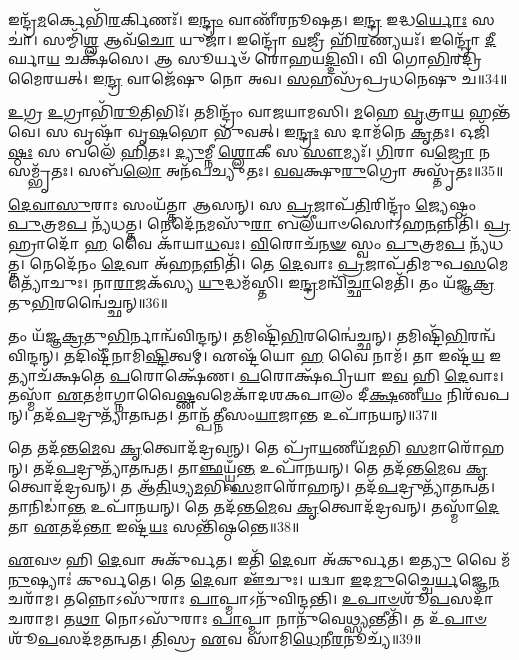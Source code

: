 𑌇𑌨𑍍𑌦𑍍𑌰᳴\-\ul{𑌮}\-𑌰𑍍𑌕𑍇𑌭𑌿᳴\-\ul{𑌰}\-𑌰𑍍𑌕𑌿𑌣𑌃᳴।
𑌇\-\ul{𑌨𑍍𑌦𑍍𑌰𑌂} 𑌵𑌾𑌣𑍀᳴𑌰𑌨𑍂𑌷𑌤।
𑌇\-\ul{𑌨𑍍𑌦𑍍𑌰} 𑌇𑌦𑍍𑌧\-\ul{𑌰𑍍𑌯𑍋𑌃} 𑌸𑌚𑌾॑।
𑌸𑌮𑍍𑌮𑌿᳴\-\ul{𑌶𑍍𑌲} 𑌆𑌵᳴\-\ul{𑌚𑍋} 𑌯𑍁𑌜𑌾॑।
𑌇𑌨𑍍𑌦𑍍𑌰𑍋᳴ \ul{𑌵}\-𑌜𑍍𑌰𑍀 𑌹𑌿᳴\-\ul{𑌰}\-𑌣𑍍𑌯𑌯𑌃᳴।
𑌇𑌨𑍍𑌦𑍍𑌰𑍋᳴ \ul{𑌦𑍀}\-𑌰𑍍𑌘𑌾\-\ul{𑌯} 𑌚𑌕𑍍𑌷᳴𑌸𑍇।
𑌆 𑌸𑍂𑌰𑍍𑌯𑍞᳴ 𑌰𑍋𑌹𑌯\-\ul{𑌦𑍍𑌦𑌿}\-𑌵𑌿।
𑌵𑌿 𑌗𑍋\-\ul{𑌭𑌿}\-𑌰𑌦𑍍𑌰𑌿᳴𑌮𑍈𑌰𑌯𑌤𑍍।
𑌇\-\ul{𑌨𑍍𑌦𑍍𑌰} 𑌵𑌾𑌜𑍇᳴𑌷𑍁 𑌨𑍋 𑌅𑌵।
\-\ul{𑌸}\-𑌹𑌸𑍍𑌰᳴𑌪𑍍𑌰𑌧𑌨𑍇𑌷𑍁 𑌚॥34॥

\-\ul{𑌉}\-𑌗𑍍𑌰 \ul{𑌉}\-𑌗𑍍𑌰𑌾𑌭𑌿᳴\-\ul{𑌰𑍂}\-𑌤𑌿𑌭𑌿𑌃᳴।
𑌤𑌮𑌿𑌨𑍍𑌦𑍍𑌰𑌂᳴ 𑌵𑌾𑌜𑌯𑌾𑌮𑌸𑌿।
\-\ul{𑌮}\-𑌹𑍇 \ul{𑌵𑍃}\-𑌤𑍍𑌰𑌾\-\ul{𑌯} 𑌹𑌨𑍍𑌤᳴𑌵𑍇।
𑌸 𑌵𑍃𑌷𑌾᳴ 𑌵𑍃\-\ul{𑌷}\-𑌭𑍋 𑌭𑍁᳴𑌵𑌤𑍍।
𑌇\-\ul{𑌨𑍍𑌦𑍍𑌰𑌃} 𑌸 𑌦𑌾𑌮᳴𑌨𑍇 \ul{𑌕𑍃}\-𑌤𑌃।
𑌓𑌜𑌿᳴\-\ul{𑌷𑍍𑌠𑌃} 𑌸 𑌬𑌲𑍇᳴ \ul{𑌹𑌿}\-𑌤𑌃।
\-\ul{𑌦𑍍𑌯𑍁}\-𑌮𑍍𑌨𑍀 \ul{𑌶𑍍𑌲𑍋}\-𑌕𑍀 𑌸 \ul{𑌸𑍗}\-𑌮𑍍𑌯𑌃᳴।
\-\ul{𑌗𑌿}\-𑌰𑌾 𑌵\-\ul{𑌜𑍍𑌰𑍋} 𑌨 𑌸𑌮𑍍𑌭𑍃᳴𑌤𑌃।
𑌸𑌬᳴\-\ul{𑌲𑍋} 𑌅𑌨᳴𑌪𑌚𑍍𑌯𑍁𑌤𑌃।
\-\ul{𑌵}\-\-\ul{𑌵}\-𑌕𑍍𑌷𑍁\-\ul{𑌰𑍁}\-𑌗𑍍𑌰𑍋 𑌅𑌸𑍍𑌤𑍃᳴𑌤𑌃॥35॥\anuvakamend[\-\ul{𑌬𑍃}\-𑌹𑌚𑍍𑌚𑌾𑌸𑍍𑌤𑍃᳴𑌤𑌃]

\-\ul{𑌦𑍇}\-\-\ul{𑌵𑌾}\-\-\ul{𑌸𑍁}\-𑌰𑌾𑌃 𑌸𑌂𑌯᳴𑌤𑍍𑌤𑌾 𑌆𑌸𑌨𑍍।
𑌸 \ul{𑌪𑍍𑌰}\-𑌜𑌾𑌪᳴\-\ul{𑌤𑌿}\-𑌰𑌿𑌨𑍍𑌦𑍍𑌰𑌂᳴ \ul{𑌜𑍍𑌯𑍇}\-𑌷𑍍𑌠𑌂 \ul{𑌪𑍁}\-𑌤𑍍𑌰𑌮\-\ul{𑌪} 𑌨𑍍𑌯᳴𑌧𑌤𑍍𑌤।
𑌨𑍇𑌦𑍇᳴\-\ul{𑌨}\-𑌮𑌸𑍁᳴\-\ul{𑌰𑌾} 𑌬𑌲𑍀᳴𑌯𑌾𑍞𑌸𑍋\-𑌽𑌹\-\ul{𑌨}\-𑌨𑍍𑌨𑌿𑌤𑌿᳴।
\-\ul{𑌪𑍍𑌰}\-𑌹𑍍𑌰𑌾𑌦𑍋᳴ \ul{𑌹} 𑌵𑍈 𑌕𑌾᳴𑌯𑌾\-\ul{𑌧}\-𑌵𑌃।
\-\ul{𑌵𑌿}\-𑌰𑍋𑌚᳴\-\ul{𑌨}\-\-\ul{𑍟} 𑌸𑍍𑌵𑌂 \ul{𑌪𑍁}\-𑌤𑍍𑌰𑌮\-\ul{𑌪} 𑌨𑍍𑌯᳴𑌧𑌤𑍍𑌤।
𑌨𑍇𑌦𑍇᳴𑌨𑌂 \ul{𑌦𑍇}\-𑌵𑌾 𑌅᳴𑌹\-\ul{𑌨}\-𑌨𑍍𑌨𑌿𑌤𑌿᳴।
𑌤𑍇 \ul{𑌦𑍇}\-𑌵𑌾𑌃 \ul{𑌪𑍍𑌰}\-𑌜𑌾𑌪᳴𑌤𑌿𑌮𑍁𑌪\-\ul{𑌸}\-𑌮𑍇𑌤𑍍𑌯𑍋᳴𑌚𑍁𑌃।
𑌨𑌾\-\ul{𑌰𑌾}\-𑌜𑌕᳴𑌸𑍍𑌯 \ul{𑌯𑍁}\-𑌦𑍍𑌧𑌮᳴𑌸𑍍𑌤𑌿।
𑌇\-\ul{𑌨𑍍𑌦𑍍𑌰}\-𑌮𑌨𑍍𑌵𑌿᳴\-\ul{𑌚𑍍𑌛𑌾}\-𑌮𑍇𑌤𑌿᳴।
𑌤𑌂 𑌯᳴𑌜𑍍𑌞\-\ul{𑌕𑍍𑌰}\-𑌤𑍁\-\ul{𑌭𑌿}\-𑌰𑌨𑍍𑌵𑍈॑𑌚𑍍𑌛𑌨𑍍॥36॥

𑌤𑌂 𑌯᳴𑌜𑍍𑌞\-\ul{𑌕𑍍𑌰}\-𑌤𑍁\-\ul{𑌭𑌿}\-𑌰𑍍𑌨𑌾𑌨𑍍𑌵᳴𑌵𑌿𑌨𑍍𑌦𑌨𑍍।
𑌤𑌮𑌿𑌷𑍍𑌟𑌿᳴\-\ul{𑌭𑌿}\-𑌰𑌨𑍍𑌵𑍈॑𑌚𑍍𑌛𑌨𑍍।
𑌤𑌮𑌿𑌷𑍍𑌟𑌿᳴\-\ul{𑌭𑌿}\-𑌰𑌨𑍍𑌵᳴\-𑌵𑌿𑌨𑍍𑌦𑌨𑍍।
𑌤𑌦𑌿𑌷𑍍𑌟𑍀᳴𑌨𑌾𑌮𑌿\-\ul{𑌷𑍍𑌟𑌿}\-\-𑌤𑍍𑌵𑌮𑍍।
𑌏𑌷𑍍𑌟᳴𑌯𑍋 \ul{𑌹} 𑌵𑍈 𑌨𑌾𑌮᳴।
𑌤𑌾 𑌇𑌷𑍍𑌟᳴\-\ul{𑌯} 𑌇𑌤𑍍𑌯𑌾𑌚᳴𑌕𑍍𑌷𑌤𑍇 \ul{𑌪}\-𑌰𑍋𑌕𑍍𑌷𑍇᳴𑌣।
\-\ul{𑌪}\-𑌰𑍋𑌕𑍍𑌷᳴𑌪𑍍𑌰𑌿𑌯𑌾 𑌇\-\ul{𑌵} 𑌹𑌿 \ul{𑌦𑍇}\-𑌵𑌾𑌃।
𑌤𑌸𑍍𑌮𑌾᳴ \ul{𑌏}\-𑌤𑌮𑌾॑𑌗𑍍𑌨𑌾𑌵𑍈\-\ul{𑌷𑍍𑌣}\-𑌵𑌮𑍇𑌕𑌾᳴\-𑌦𑌶\-𑌕𑌪𑌾𑌲𑌂 𑌦𑍀\-\ul{𑌕𑍍𑌷}\-𑌣𑍀\-\ul{𑌯𑌂} 𑌨𑌿𑌰᳴𑌵𑌪𑌨𑍍।
𑌤𑌦᳴\-\ul{𑌪}\-𑌦𑍍𑌰𑍁𑌤𑍍𑌯𑌾᳴𑌤𑌨𑍍𑌵𑌤।
𑌤𑌾𑌨𑍍𑌪᳴𑌤𑍍𑌨𑍀𑌸𑌂\-\ul{𑌯𑌾}\-𑌜𑌾\-\ul{𑌨𑍍𑌤} 𑌉𑌪𑌾᳴𑌨𑌯𑌨𑍍॥37॥

𑌤𑍇 𑌤𑌦᳴𑌨𑍍𑌤\-\ul{𑌮𑍇}\-𑌵 \ul{𑌕𑍃}\-𑌤𑍍𑌵𑍋𑌦᳴𑌦𑍍𑌰𑌵𑌨𑍍।
𑌤𑍇 𑌪𑍍𑌰𑌾᳴\-\ul{𑌯}\-𑌣𑍀𑌯᳴\-\ul{𑌮}\-𑌭𑌿 \ul{𑌸}\-𑌮𑌾𑌰𑍋᳴𑌹𑌨𑍍।
𑌤𑌦᳴\-\ul{𑌪}\-𑌦𑍍𑌰𑍁𑌤𑍍𑌯𑌾᳴\-𑌤𑌨𑍍𑌵𑌤।
𑌤𑌾\-\ul{𑌞𑍍𑌛}\-𑌯𑍍𑌯𑍍𑌵𑌁᳴\-\ul{𑌨𑍍𑌤} 𑌉𑌪𑌾᳴𑌨𑌯𑌨𑍍।
𑌤𑍇 𑌤𑌦᳴𑌨𑍍𑌤\-\ul{𑌮𑍇}\-𑌵 \ul{𑌕𑍃}\-𑌤𑍍𑌵𑍋𑌦᳴𑌦𑍍𑌰𑌵𑌨𑍍।
𑌤 𑌆᳴\-\ul{𑌤𑌿}\-𑌥𑍍𑌯\-\ul{𑌮}\-𑌭𑌿 \ul{𑌸}\-𑌮𑌾𑌰𑍋᳴𑌹𑌨𑍍।
𑌤𑌦᳴\-\ul{𑌪}\-𑌦𑍍𑌰𑍁𑌤𑍍𑌯𑌾᳴\-𑌤𑌨𑍍𑌵𑌤।
𑌤𑌾𑌨𑌿𑌡𑌾॑\-\ul{𑌨𑍍𑌤} 𑌉𑌪𑌾᳴𑌨𑌯𑌨𑍍।
𑌤𑍇 𑌤𑌦᳴𑌨𑍍𑌤\-\ul{𑌮𑍇}\-𑌵 \ul{𑌕𑍃}\-𑌤𑍍𑌵𑍋𑌦᳴𑌦𑍍𑌰𑌵𑌨𑍍।
𑌤𑌸𑍍𑌮𑌾᳴\-\ul{𑌦𑍇}\-𑌤𑌾 \ul{𑌏}\-𑌤𑌦᳴\-\ul{𑌨𑍍𑌤𑌾} 𑌇𑌷𑍍𑌟᳴\-\ul{𑌯𑌃} 𑌸𑌨𑍍𑌤𑌿᳴𑌷𑍍𑌠𑌨𑍍𑌤𑍇॥38॥

\-\ul{𑌏}\-𑌵𑍞 𑌹𑌿 \ul{𑌦𑍇}\-𑌵𑌾 𑌅𑌕𑍁᳴𑌰𑍍𑌵𑌤।
𑌇𑌤𑌿᳴ \ul{𑌦𑍇}\-𑌵𑌾 𑌅᳴𑌕𑍁𑌰𑍍𑌵𑌤।
𑌇\-\ul{𑌤𑍍𑌯𑍁} 𑌵𑍈 𑌮᳴\-\ul{𑌨𑍁}\-𑌷𑍍𑌯𑌾𑌃॑ 𑌕𑍁𑌰𑍍𑌵𑌤𑍇।
𑌤𑍇 \ul{𑌦𑍇}\-𑌵𑌾 𑌊᳴𑌚𑍁𑌃।
𑌯𑌦𑍍𑌵𑌾 \ul{𑌇}\-𑌦\-\ul{𑌮𑍁}\-𑌚𑍍𑌚𑍈\-\ul{𑌰𑍍𑌯}\-𑌜𑍍𑌞𑍇\-\ul{𑌨} 𑌚𑌰𑌾᳴𑌮।
𑌤𑌨𑍍𑌨𑍋\-𑌽𑌸𑍁᳴𑌰𑌾𑌃 \ul{𑌪𑌾}\-𑌪𑍍𑌮𑌾\-𑌽𑌨𑍁᳴𑌵𑌿𑌨𑍍𑌦𑌨𑍍𑌤𑌿।
\-\ul{𑌉}\-\-\ul{𑌪𑌾}\-\-\ul{𑍞}\-𑌶𑍂᳴\-\ul{𑌪}\-𑌸𑌦𑌾᳴ 𑌚𑌰𑌾𑌮।
𑌤\-\ul{𑌥𑌾} 𑌨𑍋𑌽𑌸𑍁᳴𑌰𑌾𑌃 \ul{𑌪𑌾}\-𑌪𑍍𑌮𑌾 𑌨𑌾𑌨𑍁᳴𑌵𑍇\-\ul{𑌥𑍍𑌸𑍍𑌯}\-𑌨𑍍𑌤𑍀𑌤𑌿᳴।
𑌤 𑌉᳴\-\ul{𑌪𑌾}\-\-\ul{𑍞}\-𑌶𑍂᳴\-\ul{𑌪}\-𑌸𑌦᳴𑌮𑌤𑌨𑍍𑌵𑌤।
\-\ul{𑌤𑌿}\-𑌸𑍍𑌰 \ul{𑌏}\-𑌵 𑌸𑌾᳴𑌮𑌿\-\ul{𑌧𑍇}\-𑌨𑍀\-\ul{𑌰}\-𑌨𑍂𑌚𑍍𑌯᳴॥39॥

